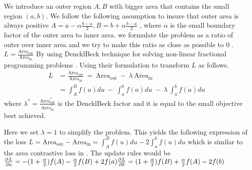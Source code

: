 We introduce an outer region $A,B$ with bigger area that contains the small region $(a,b)$. We follow the following assumption to insure that outer area is always positive $A =  a - \alpha \frac{b-a}{2} ,  B =  b + \alpha \frac{b-a}{2}$ , where $\alpha$ is the small boundary factor of the outer area to inner area.
we formulate the problem as a ratio of outer over inner area and we try to make this ratio as close as possible to 0 . 
$L =  \frac{\text{Area}_{\text{out}}}{\text{Area}_{\text{in}}}  $
By using DencklBeck technique for solving non-linear fractional programming problems \cite{dinckl}. Using their formulation to transform $L$ as follows.
\begin{equation}
\begin{aligned} 
L &= \frac{\text{Area}_{\text{out}}}{\text{Area}_{\text{in}}} ~ =~ \text{Area}_{\text{out}} ~-~ \lambda ~ \text{Area}_{\text{in}} \\
&= \int_{A}^{B}f(a)du ~ -~ \int_{a}^{b}f(a)du ~ -~ \lambda ~\int_{a}^{b}f(a)du
\label{eq:loss-oir}
\end{aligned}
\end{equation}
where $\lambda^{*} = \frac{\text{Area}_{\text{out}}^{*}}{\text{Area}_{\text{in}}^{*}}$ is the DencklBeck factor and it is equal to the small objective best achieved.

Here we set $\lambda = 1$ to simplify the problem. This yields the following expression of the loss $L =  \text{Area}_{\text{out}} - \text{Area}_{\text{in}} =  \int_{A}^{B}f(u)du  - 2\int_{a}^{b}f(u)du$ which is similar to the area contrastive loss in \cite{ioc}. The update rules would be $\frac{\partial^{} L}{\partial a} = -(1+ \frac{\alpha}{2})f(A) - \frac{\alpha}{2}f(B) + 2f(a) \\
\frac{\partial^{} L}{\partial b} = (1+ \frac{\alpha}{2})f(B) + \frac{\alpha}{2}f(A) - 2f(b)$

